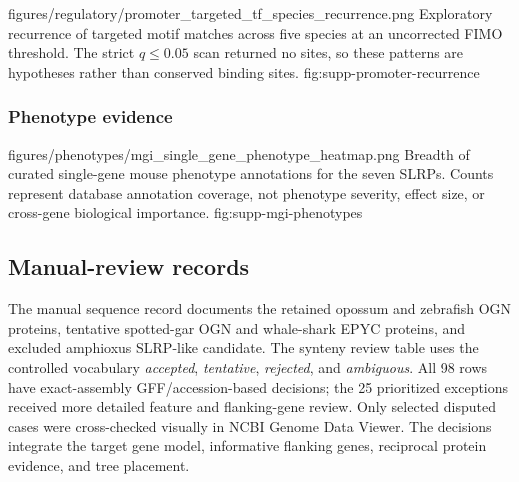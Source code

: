\thesissuppfigure
{figures/regulatory/promoter_targeted_tf_species_recurrence.png}
{Exploratory recurrence of targeted motif matches across five species at an
uncorrected FIMO threshold. The strict $q\leq0.05$ scan returned no sites, so
these patterns are hypotheses rather than conserved binding sites.}
{fig:supp-promoter-recurrence}

\clearpage
\subsubsection{Phenotype evidence}

\thesissuppfigure
{figures/phenotypes/mgi_single_gene_phenotype_heatmap.png}
{Breadth of curated single-gene mouse phenotype annotations for the seven
SLRPs. Counts represent database annotation coverage, not phenotype severity,
effect size, or cross-gene biological importance.}
{fig:supp-mgi-phenotypes}

\subsection{Manual-review records}

The manual sequence record documents the retained opossum and zebrafish OGN
proteins, tentative spotted-gar OGN and whale-shark EPYC proteins, and excluded
amphioxus SLRP-like candidate. The synteny review table uses the controlled
vocabulary \emph{accepted}, \emph{tentative}, \emph{rejected}, and
\emph{ambiguous}. All 98 rows have exact-assembly GFF/accession-based
decisions; the 25 prioritized exceptions received more detailed feature and
flanking-gene review. Only selected disputed cases were cross-checked visually
in NCBI Genome Data Viewer. The decisions integrate the target gene model,
informative flanking genes, reciprocal protein evidence, and tree placement.
